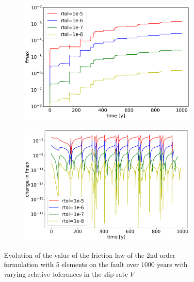 \begin{figure}[H]
	\centering
	\begin{subfigure}{0.45\textwidth}
		\centering
		\includegraphics[width=1\textwidth]{images/TANDEMtimeEvolutionFExtendedODEDifferentTolerances.png}
		\label{fig:timeEvolution_2ndOrderODE_differentTolerances}
	\end{subfigure}
	\begin{subfigure}{0.45\textwidth}
		\centering
		\includegraphics[width=1\textwidth]{images/TANDEMtimeEvolutionFLTEExtendedODEDifferentTolerances.png}
		\label{fig:timeEvolution_LTE_2ndOrderODE_differentTolerances}
	\end{subfigure}
	\caption{Evolution of the value of the friction law of the 2nd order formulation with 5 elements on the fault over 1000 years with varying relative tolerances in the slip rate $V$}
\end{figure}

